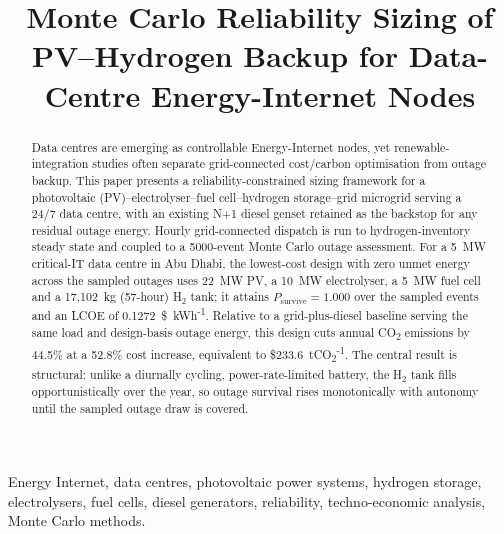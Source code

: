 \documentclass[conference]{IEEEtran}
\begin{document}
\title{Monte Carlo Reliability Sizing of PV--Hydrogen Backup for Data-Centre Energy-Internet Nodes}

\author{
}

\maketitle

\begin{abstract}
Data centres are emerging as controllable Energy-Internet nodes, yet renewable-integration studies often separate grid-connected cost/carbon optimisation from outage backup. This paper presents a reliability-constrained sizing framework for a photovoltaic (PV)--electrolyser--fuel cell--hydrogen storage--grid microgrid serving a 24/7 data centre, with an existing N+1 diesel genset retained as the backstop for any residual outage energy. Hourly grid-connected dispatch is run to hydrogen-inventory steady state and coupled to a 5000-event Monte Carlo outage assessment. For a 5~MW critical-IT data centre in Abu Dhabi, the lowest-cost design with zero unmet energy across the sampled outages uses 22~MW PV, a 10~MW electrolyser, a 5~MW fuel cell and a 17{,}102~kg (57-hour) H$_2$ tank; it attains $P_{\mathrm{survive}}=1.000$ over the sampled events and an LCOE of 0.1272~\$~kWh\textsuperscript{-1}. Relative to a grid-plus-diesel baseline serving the same load and design-basis outage energy, this design cuts annual CO\textsubscript{2} emissions by 44.5\% at a 52.8\% cost increase, equivalent to \$233.6~tCO\textsubscript{2}\textsuperscript{-1}. The central result is structural: unlike a diurnally cycling, power-rate-limited battery, the H$_2$ tank fills opportunistically over the year, so outage survival rises monotonically with autonomy until the sampled outage draw is covered.
\end{abstract}

\begin{IEEEkeywords}
Energy Internet, data centres, photovoltaic power systems, hydrogen storage, electrolysers, fuel cells, diesel generators, reliability, techno-economic analysis, Monte Carlo methods.
\end{IEEEkeywords}
\end{document}
